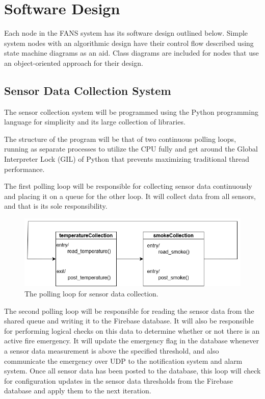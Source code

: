 \section{Software Design}

Each node in the FANS system has its software design outlined below. Simple system nodes with an algorithmic design
have their control flow described using state machine diagrams as an aid. Class diagrams are included for nodes that
use an object-oriented approach for their design.

\subsection{Sensor Data Collection System}

The sensor collection system will be programmed using the Python programming language for simplicity and its large
collection of libraries.

The structure of the program will be that of two continuous polling loops, running as separate processes to utilize the
CPU fully and get around the Global Interpreter Lock (GIL) of Python that prevents maximizing traditional thread
performance.

The first polling loop will be responsible for collecting sensor data continuously and placing it on a queue for the
other loop. It will collect data from all sensors, and that is its sole responsibility.

\begin{figure}[H]
    \centering
    \includegraphics[width=\linewidth]{../assets/state-machine/DataCollectionStateMachine.png}
    \caption{The polling loop for sensor data collection.}
\end{figure}

The second polling loop will be responsible for reading the sensor data from the shared queue and writing it to the
Firebase database. It will also be responsible for performing logical checks on this data to determine whether or not
there is an active fire emergency. It will update the emergency flag in the database whenever a sensor data measurement
is above the specified threshold, and also communicate the emergency over UDP to the notification system and alarm
system. Once all sensor data has been posted to the database, this loop will check for configuration updates in the
sensor data thresholds from the Firebase database and apply them to the next iteration.

